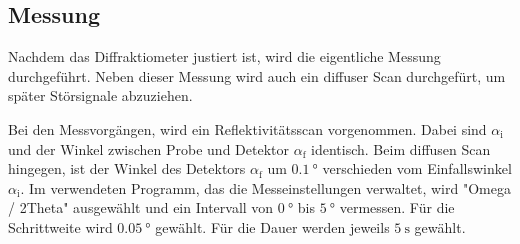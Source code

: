 \subsection{Messung}
\label{subsec:messung}
Nachdem das Diffraktiometer justiert ist, wird
die eigentliche Messung durchgeführt.
Neben dieser Messung wird auch ein diffuser Scan durchgefürt,
um später Störsignale abzuziehen.

Bei den Messvorgängen, wird ein Reflektivitätsscan vorgenommen.
Dabei sind $\alpha_{\text{i}}$ und der Winkel zwischen Probe und Detektor
$\alpha_{\text{f}}$ identisch. Beim diffusen Scan hingegen,
ist der Winkel des Detektors $\alpha_{\text{f}}$ um
$\SI{0.1}{\degree}$ verschieden vom Einfallswinkel $\alpha_{\text{i}}$.
Im verwendeten Programm, das die Messeinstellungen verwaltet, wird
"Omega / 2Theta" ausgewählt und ein Intervall von $\SI{0}{\degree}$ bis
$\SI{5}{\degree}$ vermessen.
Für die Schrittweite wird $\SI{0.05}{\degree}$
gewählt. Für die Dauer werden jeweils $\SI{5}{\second}$ gewählt.



